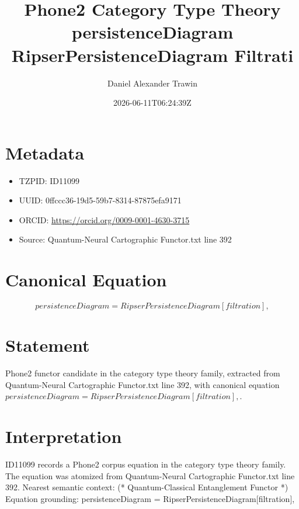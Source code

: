 \documentclass[11pt]{article}
\title{Phone2 Category Type Theory persistenceDiagram RipserPersistenceDiagram Filtrati}
\author{Daniel Alexander Trawin}
\date{2026-06-11T06:24:39Z}
\begin{document}
\maketitle
\section*{Metadata}
\begin{itemize}
\item TZPID: ID11099
\item UUID: 0ffccc36-19d5-59b7-8314-87875efa9171
\item ORCID: \url{https://orcid.org/0009-0001-4630-3715}
\item Source: Quantum-Neural Cartographic Functor.txt line 392
\end{itemize}
\section*{Canonical Equation}
\[
persistenceDiagram = RipserPersistenceDiagram[filtration],
\]
\section*{Statement}
Phone2 functor candidate in the category type theory family, extracted from Quantum-Neural Cartographic Functor.txt line 392, with canonical equation $persistenceDiagram = RipserPersistenceDiagram[filtration],$.
\section*{Interpretation}
ID11099 records a Phone2 corpus equation in the category type theory family. The equation was atomized from Quantum-Neural Cartographic Functor.txt line 392. Nearest semantic context: (* Quantum-Classical Entanglement Functor *) Equation grounding: persistenceDiagram = RipserPersistenceDiagram[filtration],
\end{document}
